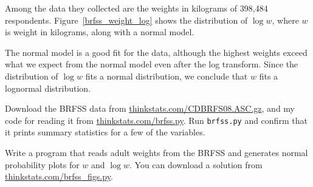 \documentclass[12pt]{book}
\begin{document}
Among the data they collected are the weights in kilograms of
398,484 respondents.
Figure~\ref{brfss_weight_log} shows the distribution
of $\log w$, where $w$ is weight in kilograms, along with a normal
model.


The normal model is a good fit for the data, although the highest
weights exceed what we expect from the normal model even after the log
transform.  Since the distribution of $\log w$ fits a normal distribution, we
conclude that $w$ fits a lognormal distribution.







\begin{ex}


Download the BRFSS data from 
\url{thinkstats.com/CDBRFS08.ASC.gz}, and my code for reading it
from
\url{thinkstats.com/brfss.py}.  Run {\tt brfss.py} and confirm that
it prints summary statistics for a few of the variables.


Write a program that reads adult weights from the BRFSS and
generates normal probability plots for $w$ and $\log w$.  You can
download a solution from \url{thinkstats.com/brfss_figs.py}.

\end{ex}
\end{document}
